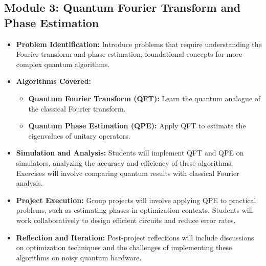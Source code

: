 \subsection{Module 3: Quantum Fourier Transform and Phase Estimation}
\begin{itemize}
    \item \textbf{Problem Identification:} Introduce problems that require understanding the Fourier transform and phase estimation, foundational concepts for more complex quantum algorithms.
    \item \textbf{Algorithms Covered:}
    \begin{itemize}
        \item \textbf{Quantum Fourier Transform (QFT):} Learn the quantum analogue of the classical Fourier transform.
        \item \textbf{Quantum Phase Estimation (QPE):} Apply QFT to estimate the eigenvalues of unitary operators.
    \end{itemize}
    \item \textbf{Simulation and Analysis:} Students will implement QFT and QPE on simulators, analyzing the accuracy and efficiency of these algorithms. Exercises will involve comparing quantum results with classical Fourier analysis.
    \item \textbf{Project Execution:} Group projects will involve applying QPE to practical problems, such as estimating phases in optimization contexts. Students will work collaboratively to design efficient circuits and reduce error rates.
    \item \textbf{Reflection and Iteration:} Post-project reflections will include discussions on optimization techniques and the challenges of implementing these algorithms on noisy quantum hardware.
\end{itemize}

